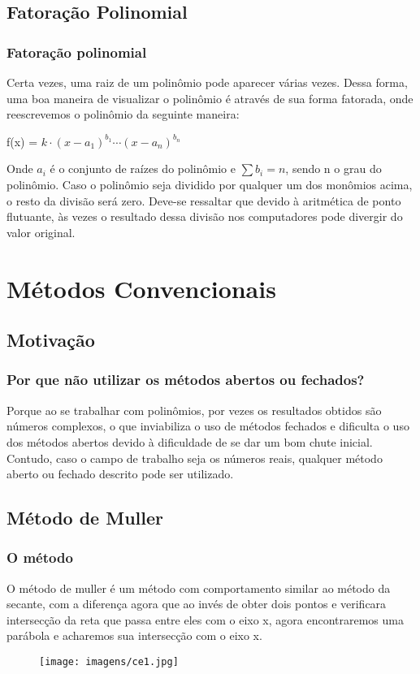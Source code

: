 \documentclass{beamer}
\begin{document}
\subsection{Fatoração Polinomial}

\begin{frame}
\frametitle{Fatoração polinomial}
	Certa vezes, uma raiz de um polinômio pode aparecer várias vezes. Dessa forma, uma boa maneira de visualizar o polinômio é através de sua forma fatorada, onde reescrevemos o polinômio da seguinte maneira:
	
	\begin{block}
		f(x) = $k\cdot\left(x-a_1\right)^{b_1}\cdots\left(x-a_n\right)^{b_n}$
	\end{block}

    Onde $a_i$ é o conjunto de raízes do polinômio e $\sum b_i = n$, sendo n o grau do polinômio. Caso o polinômio seja dividido por qualquer um dos monômios acima, o resto da divisão será zero. Deve-se ressaltar que devido à aritmética de ponto flutuante, às vezes o resultado dessa divisão nos computadores pode divergir do valor original.
\end{frame}

\section{Métodos Convencionais}
\subsection{Motivação}
\begin{frame}
\frametitle{Por que não utilizar os métodos abertos ou fechados?}
	Porque ao se trabalhar com polinômios, por vezes os resultados obtidos são números complexos, o que inviabiliza o uso de métodos fechados e dificulta o uso dos métodos abertos devido à dificuldade de se dar um bom chute inicial. Contudo, caso o campo de trabalho seja os números reais, qualquer método aberto ou fechado descrito pode ser utilizado.
\end{frame}

\subsection{Método de Muller}
\begin{frame}
\frametitle{O método}
	O método de muller é um método com comportamento similar ao método da secante, com a diferença agora que ao invés de obter dois pontos e verificara intersecção da reta que passa entre eles com o eixo x, agora encontraremos uma parábola e acharemos sua intersecção com o eixo x.
	
	\begin{figure}[h]
		\texttt{[image: imagens/ce1.jpg]}
	\end{figure}

\end{frame}
\end{document}

